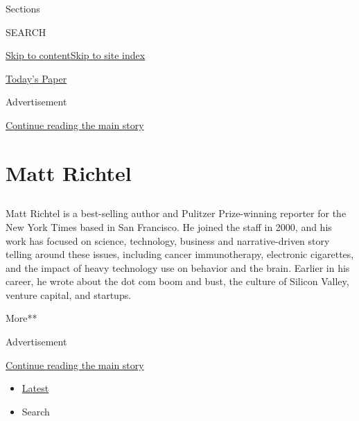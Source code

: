 Sections

SEARCH

\protect\hyperlink{site-content}{Skip to
content}\protect\hyperlink{site-index}{Skip to site index}

\href{https://myaccount.nytimes.com/auth/login?response_type=cookie\&client_id=vi}{}

\href{https://www.nytimes.com/section/todayspaper}{Today's Paper}

Advertisement

\protect\hyperlink{after-top}{Continue reading the main story}

\hypertarget{matt-richtel}{%
\section{Matt Richtel}\label{matt-richtel}}

\subsection{}

Matt Richtel is a best-selling author and Pulitzer Prize-winning
reporter for the New York Times based in San Francisco. He joined the
staff in 2000, and his work has focused on science, technology, business
and narrative-driven story telling around these issues, including cancer
immunotherapy, electronic cigarettes, and the impact of heavy technology
use on behavior and the brain. Earlier in his career, he wrote about the
dot com boom and bust, the culture of Silicon Valley, venture capital,
and startups.

More**

Advertisement

\protect\hyperlink{after-mid1}{Continue reading the main story}

\begin{itemize}
\tightlist
\item
  \protect\hyperlink{stream-panel}{Latest}
\item
  Search
\end{itemize}

